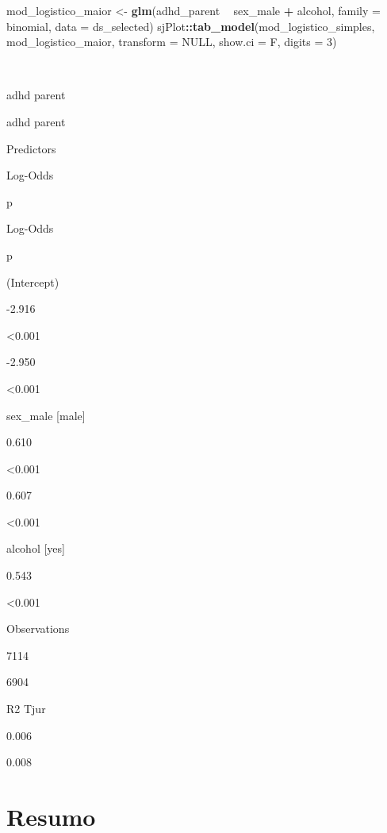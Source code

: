 \documentclass[
]{book}
\newenvironment{Shaded}{\begin{snugshade}}{\end{snugshade}}
\newcommand{\DataTypeTok}[1]{\textcolor[rgb]{0.13,0.29,0.53}{#1}}
\newcommand{\DecValTok}[1]{\textcolor[rgb]{0.00,0.00,0.81}{#1}}
\newcommand{\KeywordTok}[1]{\textcolor[rgb]{0.13,0.29,0.53}{\textbf{#1}}}
\newcommand{\NormalTok}[1]{#1}
\newcommand{\OperatorTok}[1]{\textcolor[rgb]{0.81,0.36,0.00}{\textbf{#1}}}
\newcommand{\OtherTok}[1]{\textcolor[rgb]{0.56,0.35,0.01}{#1}}
\newcommand{\StringTok}[1]{\textcolor[rgb]{0.31,0.60,0.02}{#1}}
\begin{document}
\begin{Shaded}
\begin{Highlighting}[]
\NormalTok{mod_logistico_maior <-}\StringTok{ }\KeywordTok{glm}\NormalTok{(adhd_parent }\OperatorTok{~}\StringTok{ }\NormalTok{sex_male }\OperatorTok{+}\StringTok{ }
\StringTok{                             }\NormalTok{alcohol, }
                           \DataTypeTok{family =}\NormalTok{ binomial, }
                           \DataTypeTok{data =}\NormalTok{ ds_selected)}
\NormalTok{sjPlot}\OperatorTok{::}\KeywordTok{tab_model}\NormalTok{(mod_logistico_simples, }
\NormalTok{                  mod_logistico_maior, }
                  \DataTypeTok{transform =} \OtherTok{NULL}\NormalTok{, }
                  \DataTypeTok{show.ci =}\NormalTok{ F,}
                  \DataTypeTok{digits =} \DecValTok{3}\NormalTok{)}
\end{Highlighting}
\end{Shaded}

~

adhd parent

adhd parent

Predictors

Log-Odds

p

Log-Odds

p

(Intercept)

-2.916

\textless0.001

-2.950

\textless0.001

sex\_male {[}male{]}

0.610

\textless0.001

0.607

\textless0.001

alcohol {[}yes{]}

0.543

\textless0.001

Observations

7114

6904

R2 Tjur

0.006

0.008

\hypertarget{resumo-7}{%
\section{Resumo}\label{resumo-7}}
\end{document}
